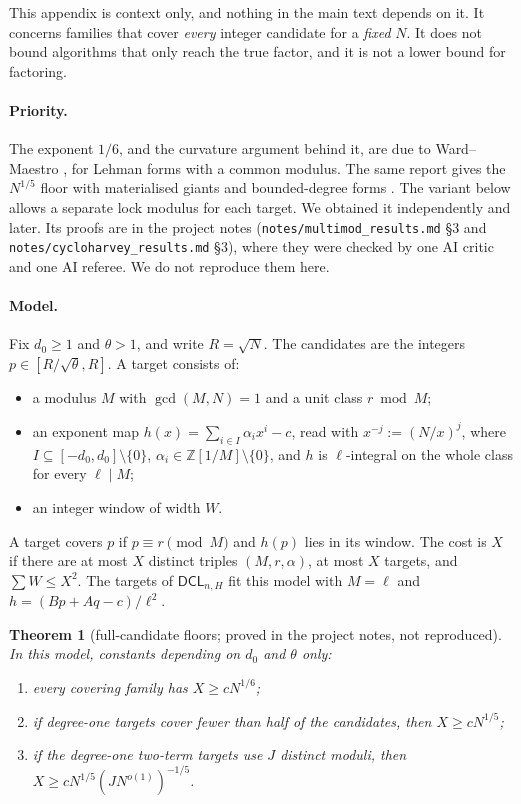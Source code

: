 \documentclass[11pt]{amsart}
\newtheorem{theorem}{Theorem}[section]
\theoremstyle{definition}
\newcommand{\Z}{\mathbb{Z}}
\newcommand{\DCL}{\textsf{DCL}}
\begin{document}
This appendix is context only, and nothing in the main text depends on it. It concerns families
that cover \emph{every} integer candidate for a \emph{fixed} $N$. It does not bound algorithms that
only reach the true factor, and it is not a lower bound for factoring.

\paragraph{Priority.} The exponent $1/6$, and the curvature argument behind it, are due to
Ward--Maestro \cite[Lemma~3.2, Cor.~3.3, Thm.~3.6]{wardmaestro2026}, for Lehman forms with a
common modulus. The same report gives the $N^{1/5}$ floor with materialised giants
\cite[Thm.~3.4]{wardmaestro2026} and bounded-degree forms \cite[Thm.~9.4]{wardmaestro2026}. The
variant below allows a separate lock modulus for each target. We obtained it independently and
later. Its proofs are in the project notes (\texttt{notes/multimod\_results.md} \S3 and
\texttt{notes/cycloharvey\_results.md} \S3), where they were checked by one AI critic and one AI
referee. We do not reproduce them here.

\paragraph{Model.} Fix $d_0\ge1$ and $\theta>1$, and write $R=\sqrt N$. The candidates are the
integers $p\in[R/\sqrt\theta,R]$. A target consists of:
\begin{itemize}
\item a modulus $M$ with $\gcd(M,N)=1$ and a unit class $r\bmod M$;
\item an exponent map $h(x)=\sum_{i\in I}\alpha_ix^{i}-c$, read with $x^{-j}:=(N/x)^j$, where
  $I\subseteq[-d_0,d_0]\setminus\{0\}$, $\alpha_i\in\Z[1/M]\setminus\{0\}$, and $h$ is
  $\ell$-integral on the whole class for every $\ell\mid M$;
\item an integer window of width $W$.
\end{itemize}
A target covers $p$ if $p\equiv r\pmod M$ and $h(p)$ lies in its window. The cost is $X$ if there
are at most $X$ distinct triples $(M,r,\alpha)$, at most $X$ targets, and $\sum W\le X^2$. The
targets of $\DCL_{n,H}$ fit this model with $M=\ell$ and $h=(Bp+Aq-c)/\ell^2$.

\begin{theorem}[full-candidate floors; proved in the project notes, not reproduced]\label{thm:A}
In this model, constants depending on $d_0$ and $\theta$ only:
\begin{enumerate}[label=(\alph*)]
\item every covering family has $X\ge cN^{1/6}$;
\item if degree-one targets cover fewer than half of the candidates, then $X\ge cN^{1/5}$;
\item if the degree-one two-term targets use $J$ distinct moduli, then
  $X\ge cN^{1/5}(JN^{o(1)})^{-1/5}$.
\end{enumerate}
\end{theorem}
\end{document}
